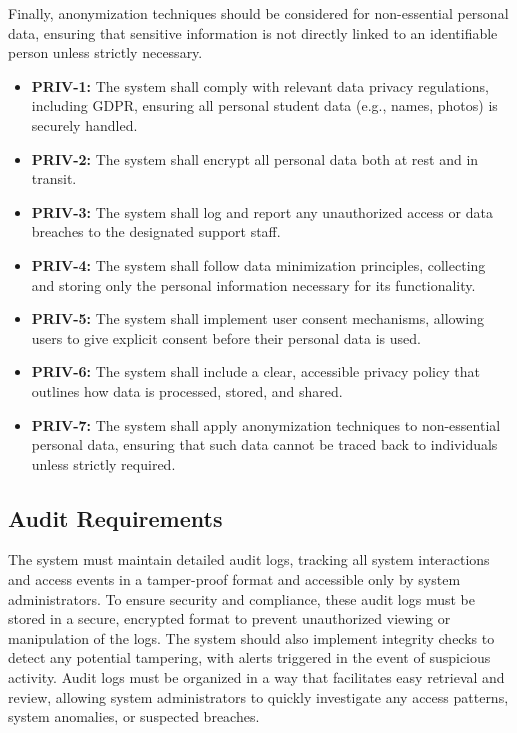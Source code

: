 \documentclass[12pt]{article}
\begin{document}
Finally, anonymization techniques should be considered for non-essential personal data, ensuring that sensitive information is not directly linked to an identifiable person unless strictly necessary.

\begin{itemize}
    \item \textbf{PRIV-1:} The system shall comply with relevant data privacy regulations, including GDPR, ensuring all personal student data (e.g., names, photos) is securely handled.
    \item \textbf{PRIV-2:} The system shall encrypt all personal data both at rest and in transit.
    \item \textbf{PRIV-3:} The system shall log and report any unauthorized access or data breaches to the designated support staff.
    \item \textbf{PRIV-4:} The system shall follow data minimization principles, collecting and storing only the personal information necessary for its functionality.
    \item \textbf{PRIV-5:} The system shall implement user consent mechanisms, allowing users to give explicit consent before their personal data is used.
    \item \textbf{PRIV-6:} The system shall include a clear, accessible privacy policy that outlines how data is processed, stored, and shared.
    \item \textbf{PRIV-7:} The system shall apply anonymization techniques to non-essential personal data, ensuring that such data cannot be traced back to individuals unless strictly required.
\end{itemize}

\subsection{Audit Requirements}
The system must maintain detailed audit logs, tracking all system interactions and access events in a tamper-proof format and accessible only by system administrators. To ensure security and compliance, these audit logs must be stored in a secure, encrypted format to prevent unauthorized viewing or manipulation of the logs. The system should also implement integrity checks to detect any potential tampering, with alerts triggered in the event of suspicious activity. Audit logs must be organized in a way that facilitates easy retrieval and review, allowing system administrators to quickly investigate any access patterns, system anomalies, or suspected breaches.
\end{document}
